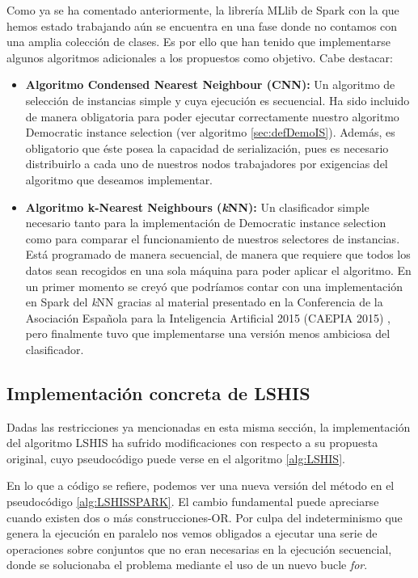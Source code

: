 Como ya se ha comentado anteriormente, la librería MLlib de Spark con la que hemos estado trabajando aún se encuentra en una fase donde no contamos con una amplia colección de clases. Es por ello que han tenido que implementarse algunos algoritmos adicionales a los propuestos como objetivo. Cabe destacar:

\begin{itemize}
\item \textbf{Algoritmo Condensed Nearest Neighbour (CNN):} Un algoritmo de selección de instancias simple y cuya ejecución es secuencial. Ha sido incluido de manera obligatoria para poder ejecutar correctamente nuestro algoritmo Democratic instance selection (ver algoritmo \ref{sec:defDemoIS}). Además, es obligatorio que éste posea la capacidad de serialización, pues es necesario distribuirlo a cada uno de nuestros nodos trabajadores por exigencias del algoritmo que deseamos implementar.
\item  \textbf{Algoritmo k-Nearest Neighbours (\textit{k}NN):} Un clasificador simple necesario tanto para la implementación de Democratic instance selection como para comparar el funcionamiento de nuestros selectores de instancias. Está programado de manera secuencial, de manera que requiere que todos los datos sean recogidos en una sola máquina para poder aplicar el algoritmo. En un primer momento se creyó que podríamos contar con una implementación en Spark del \textit{k}NN gracias al material presentado en la Conferencia de la Asociación Española para la Inteligencia Artificial 2015 (CAEPIA 2015) \cite{KNNConferencia}, pero finalmente tuvo que implementarse una versión menos ambiciosa del clasificador.
\end{itemize}


\subsection{Implementación concreta de LSHIS}

Dadas las restricciones ya mencionadas en esta misma sección, la implementación del algoritmo LSHIS ha sufrido modificaciones con respecto a su propuesta original, cuyo pseudocódigo puede verse en el algoritmo \ref{alg:LSHIS}.

En lo que a código se refiere, podemos ver una nueva versión del método en el pseudocódigo \ref{alg:LSHISSPARK}. El cambio fundamental puede apreciarse cuando existen dos o más construcciones-OR. Por culpa del indeterminismo que genera la ejecución en paralelo nos vemos obligados a ejecutar una serie de operaciones sobre conjuntos que no eran necesarias en la ejecución secuencial, donde se solucionaba el problema mediante el uso de un nuevo bucle \textit{for}.

